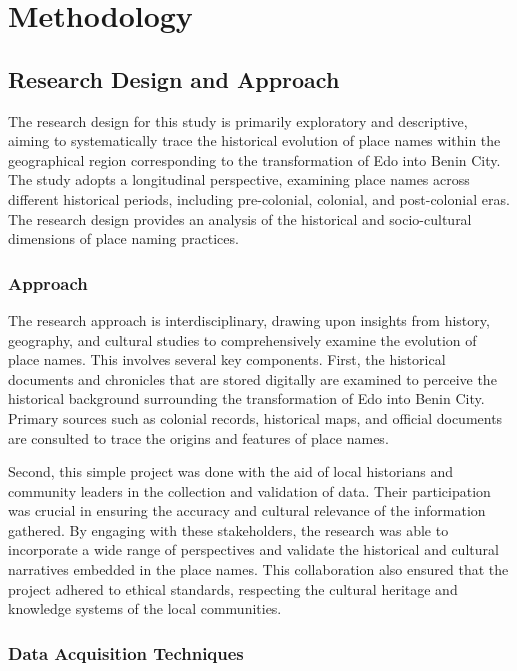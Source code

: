 \chapter{Methodology}

\section{Research Design and Approach}

The research design for this study is primarily exploratory and descriptive, aiming to systematically trace the historical evolution of place names within the geographical region corresponding to the transformation of Edo into Benin City. The study adopts a longitudinal perspective, examining place names across different historical periods, including pre-colonial, colonial, and post-colonial eras. The research design provides an analysis of the historical and socio-cultural dimensions of place naming practices.

\subsection{Approach}

The research approach is interdisciplinary, drawing upon insights from history, geography, and cultural studies to comprehensively examine the evolution of place names. This involves several key components. First, the historical documents and chronicles that are stored digitally are examined to perceive the historical background surrounding the transformation of Edo into Benin City. Primary sources such as colonial records, historical maps, and official documents are consulted to trace the origins and features of place names.

Second, this simple project was done with the aid of local historians and community leaders in the collection and validation of data. Their participation was crucial in ensuring the accuracy and cultural relevance of the information gathered. By engaging with these stakeholders, the research was able to incorporate a wide range of perspectives and validate the historical and cultural narratives embedded in the place names. This collaboration also ensured that the project adhered to ethical standards, respecting the cultural heritage and knowledge systems of the local communities.

\subsection{Data Acquisition Techniques}

